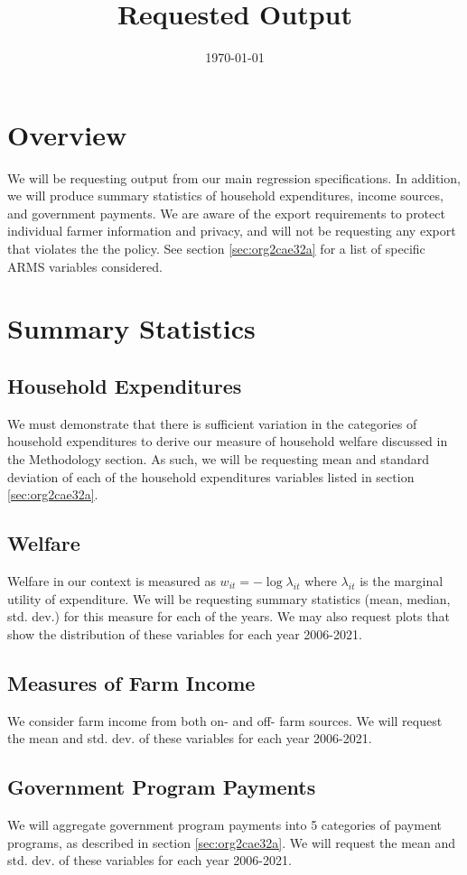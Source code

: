 \documentclass[11pt]{article}
\date{\today}
\title{Requested Output}
\begin{document}
\maketitle
\section{Overview}
\label{sec:org266715d}
We will be requesting output from our main regression specifications. In addition, we will produce summary statistics of household expenditures, income sources, and government payments. We are aware of the export requirements to protect individual farmer information and privacy, and will not be requesting any export that violates the the policy. See section \ref{sec:org2cae32a} for a list of specific ARMS variables considered.
\section{Summary Statistics}
\label{sec:org9425eb0}
\subsection{Household Expenditures}
\label{sec:org9892cd3}
We must demonstrate that there is sufficient variation in the categories of household expenditures to derive our measure of household welfare discussed in the Methodology section. As such, we will be requesting mean and standard deviation of each of the household expenditures variables listed in section \ref{sec:org2cae32a}.   
\subsection{Welfare}
\label{sec:orgfecc3a3}
Welfare in our context is measured as \(w_{it} = -\log \lambda_{it}\) where \(\lambda_{it}\) is the marginal utility of expenditure. We will be requesting summary statistics (mean, median, std. dev.) for this measure for each of the years. We may also request plots that show the distribution of these variables for each year 2006-2021.  
\subsection{Measures of Farm Income}
\label{sec:org572fab0}
We consider farm income from both on- and off- farm sources. We will request the mean and std. dev. of these variables for each year 2006-2021. 
\subsection{Government Program Payments}
\label{sec:orgb762dfb}
We will aggregate government program payments into 5 categories of payment programs, as described in section \ref{sec:org2cae32a}. We will request the mean and std. dev. of these variables for each year 2006-2021. 
\end{document}
